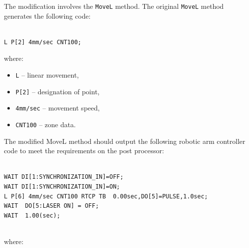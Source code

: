 

The modification involves the \texttt{MoveL} method. The original \texttt{MoveL} method generates the following code:


\begin{verbatim}

L P[2] 4mm/sec CNT100;

\end{verbatim}


where:

\begin{itemize}

    \item \texttt{L} -- linear movement,
    \item \texttt{P[2]} -- designation of point,
    \item \texttt{4mm/sec} -- movement speed,
    \item \texttt{CNT100} -- zone data.

\end{itemize}

The modified MoveL method should output the following robotic arm controller code to meet the requirements on the post processor:


\begin{verbatim}

WAIT DI[1:SYNCHRONIZATION_IN]=OFF;
WAIT DI[1:SYNCHRONIZATION_IN]=ON;
L P[6] 4mm/sec CNT100 RTCP TB  0.00sec,DO[5]=PULSE,1.0sec;
WAIT  DO[5:LASER ON] = OFF;
WAIT  1.00(sec);
  
\end{verbatim}


where:

